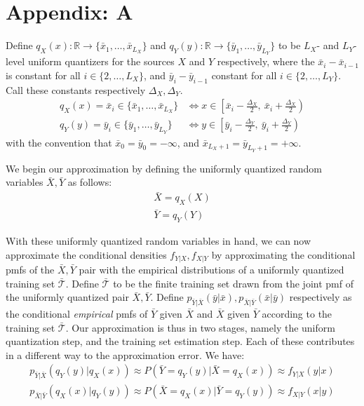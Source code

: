 
\section{Appendix: A}
Define
$q_X(x):\mathbb{R} \rightarrow \{\bar x_1,\ldots,\bar x_{L_X}\}$
and
$q_Y(y):\mathbb{R} \rightarrow \{\bar y_1,\ldots,\bar y_{L_Y}\}$
to be $L_X$- and $L_Y$-level uniform quantizers for the sources $X$ and $Y$ respectively, where the $\bar x_i-\bar x_{i-1}$ is constant for all $i\in \{2,\ldots,L_X\}$, and $\bar y_i-\bar y_{i-1}$ constant for all $i\in \{2,\ldots,L_Y\}$. Call these constants respectively $\Delta_X, \Delta_Y$.
\begin{align}
    q_X(x) = \bar x_i \in \{\bar x_1,\ldots,\bar x_{L_X}\} &\iff x \in  \left[\bar x_{i}-\frac{\Delta_X}{2},\ \bar x_i+\frac{\Delta_X}{2}\right)\\
    q_Y(y) = \bar y_i \in \{\bar y_1,\ldots,\bar y_{L_Y}\} &\iff y \in  \left[\bar y_{i}-\frac{\Delta_Y}{2},\ \bar y_i+\frac{\Delta_Y}{2}\right)
\end{align}
with the convention that $\bar x_{0}=\bar y_{0}=-\infty$, and $\bar x_{L_X+1}=\bar y_{L_Y+1}=+\infty$.

We begin our approximation by defining the uniformly quantized random variables $\bar X, \bar Y$ as follows:
\begin{align}
    \bar X = q_X(X)\\
    \bar Y = q_Y(Y)
\end{align}

With these uniformly quantized random variables in hand, we can now approximate the conditional densities $f_{Y|X}, f_{X|Y}$ by approximating the conditional pmfs of the $\bar X, \bar Y$ pair with the empirical distributions of a uniformly quantized training set $\mathcal{\bar T}$. Define $\mathcal{\bar T}$ to be the finite training set drawn from the joint pmf of the uniformly quantized pair $\bar X, \bar Y$. Define $p_{\bar Y|\bar X}(\bar y|\bar x),p_{\bar X|\bar Y}(\bar x|\bar y)$ respectively as the conditional \emph{empirical} pmfs of $\bar Y$ given $\bar X$ and $\bar X$ given $\bar Y$ according to the training set $\mathcal{\bar T}$. Our approximation is thus in two stages, namely the uniform quantization step, and the training set estimation step. Each of these contributes in a different way to the approximation error. We have:
\begin{align}
    p_{\bar Y|\bar X}(q_Y(y)|q_X(x)) \approx 
        P(\bar Y=q_Y(y) | \bar X=q_X(x)) \approx
            f_{Y|X}(y|x)\\
    p_{\bar X|\bar Y}(q_X(x)|q_Y(y)) \approx 
        P(\bar X=q_X(x) | \bar Y=q_Y(y)) \approx
            f_{X|Y}(x|y)
\end{align}

